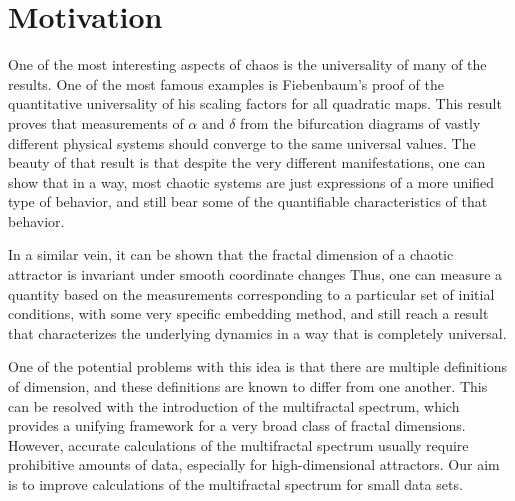 \section{Motivation}

One of the most interesting aspects of chaos is the universality of many of the results.  One of the most famous examples is Fiebenbaum's proof of the quantitative universality of his scaling factors for all quadratic maps.  This result proves that measurements of $\alpha$ and $\delta$ from the bifurcation diagrams of vastly different physical systems should converge to the same universal values.  The beauty of that result is that despite the very different manifestations, one can show that in a way, most chaotic systems are just expressions of a more unified type of behavior, and still bear some of the quantifiable characteristics of that behavior.

In a similar vein, it can be shown that %
the fractal dimension of a chaotic attractor is invariant under smooth coordinate changes %
Thus, one can measure a quantity based on the measurements corresponding to a particular set of initial conditions, with some very specific embedding method, and still reach a result that characterizes the underlying dynamics in a way that is completely universal.


One of the potential problems with this idea is that there are multiple definitions of dimension, and these definitions are known to differ from one another.  This can be resolved with the introduction of the multifractal spectrum, which provides a unifying framework for a very broad class of fractal dimensions.  However, accurate calculations of the multifractal spectrum usually require prohibitive amounts of data, especially for high-dimensional attractors.  Our aim is to improve calculations of the multifractal spectrum for small data sets.